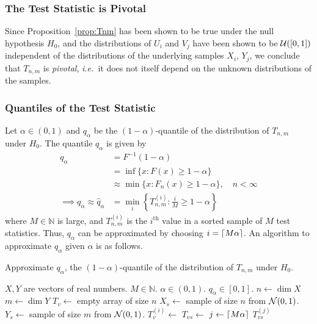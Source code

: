 \documentclass[letterpaper, reqno]{amsart}
\numberwithin{equation}{section}
\DeclarePairedDelimiter{\ceil}{\lceil}{\rceil}
\newcommand{\ie}{\emph{i.e.\ }}
\newcommand{\N}[2]{\mathcal{N}\mleft( #1, #2 \mright)}
\newcommand{\U}[2]{\mathcal{U}\mleft(\mleft[ #1, #2 \mright]\mright)}
\begin{document}
\subsubsection{The Test Statistic is Pivotal}
Since Proposition~\ref{prop:Tnm} has been shown to be true under the null hypothesis $H_0$, and the distributions of $U_i$
and $V_j$ have been shown to be $\U{0}{1}$ independent of the distributions of
the underlying samples $X_i$, $Y_j$, we conclude that $T_{n,m}$ is
\emph{pivotal}, \ie it does not itself depend on the unknown distributions of
the samples.

\clearpage
\subsubsection{Quantiles of the Test Statistic}
Let $\alpha \in (0, 1)$ and $q_\alpha$ be the $(1 - \alpha)$-quantile of the
distribution of $T_{n,m}$ under $H_0$. The quantile $q_\alpha$ is given by
\begin{align*}
  q_\alpha &= F^{-1}(1-\alpha) \\
           &= \inf\{x \colon F(x) \ge 1 - \alpha\} \\
           &\approx \min\{x \colon F_n(x) \ge 1 - \alpha\}, \quad n < \infty \\
           \implies q_\alpha \approx \hat{q}_\alpha &= \min_i \left\{
               T_{n,m}^{(i)} \colon \tfrac{i}{M} \ge 1 - \alpha \right\}
\end{align*}
where $M \in \mathbb{N}$ is large, and $T_{n,m}^{(i)}$ is the $i^\text{th}$
value in a sorted sample of $M$ test statistics. Thus, $q_\alpha$ can be
approximated by choosing $i = \ceil{M\alpha}$. An algorithm to approximate
$q_\alpha$ given $\alpha$ is as follows.

\begin{algorithm}[!h]
  \caption{Approximate $q_\alpha$, the $(1 - \alpha)$-quantile of the
distribution of $T_{n,m}$ under $H_0$.}
  \label{alg:ks_q}
  \begin{algorithmic}
    \Require $X, Y$ are vectors of real numbers. $M \in \mathbb{N}$. $\alpha
    \in (0, 1)$.
    \Ensure $q_\alpha \in [0, 1]$.
      \State $n \gets \dim X$
      \State $m \gets \dim Y$
      \State $T_v \gets$ empty array of size $n$
        \State $X_s \gets$ sample of size $n$ from $\N{0}{1}$.
        \State $Y_s \gets$ sample of size $m$ from $\N{0}{1}$.
        \State $T_v^{(i)} \gets$ 
      \EndFor
      \State $T_{vs} \gets$ 
      \State $j \gets \ceil*{M\alpha}$
      \State \Return $T_{vs}^{(j)}$
    \EndProcedure
  \end{algorithmic}
\end{algorithm}
\end{document}

